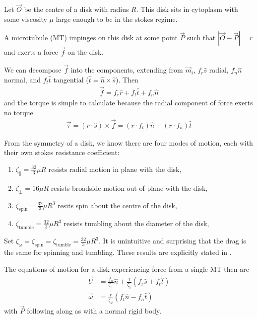 \documentclass[footheight=20pt, footsepline, headheight=20pt, headsepline]{scrartcl}
\begin{document}
	Let $\vec{O}$ be the centre of a disk with radius $R$. This disk sits in cytoplasm with some viscosity $\mu$ large enough to be in the stokes regime.

	A microtubule (MT) impinges on this disk at some point $\vec{P}$ such that $|\vec{O} - \vec{P}| = r$ and exerts a force $\vec{f}$ on the disk.

	We can decompose $\vec{f}$ into the components, extending from $\vec{m}_i$, $f_r \hat{s}$ radial, $f_n \hat{n}$ normal, and $f_t \hat{t}$ tangential ($\hat{t} = \hat{n} \times \hat{s}$).
	Then 
	\begin{align}
		\vec{f} = f_r \hat{r} + f_t \hat{t} + f_n \hat{n}
	\end{align}
	and the torque is simple to calculate because the radial component of force exerts no torque
	\begin{align}
		\vec{\tau} = (r \cdot \hat{s}) \times \vec{f} =  (r \cdot f_t) \hat{n} - (r \cdot f_n) \hat{t}
	\end{align}

	From the symmetry of a disk, we know there are four modes of motion, each with their own stokes resistance coefficient:
	\begin{enumerate}
		\item $\zeta_\parallel = \frac{32}{3} \mu R$ resists radial motion in plane with the disk,
		\item $\zeta_\perp = 16 \mu R$ resists broadside motion out of plane with the disk,
		\item $\zeta_\text{spin} = \frac{32}{3} \mu R^3$ resits spin about the centre of the disk,
		\item $\zeta_\text{tumble} = \frac{32}{3} \mu R^3$ resists tumbling about the diameter of the disk,
	\end{enumerate}
	Set $\zeta_\omega = \zeta_\text{spin} = \zeta_\text{tumble} = \frac{32}{3} \mu R^3$.
	It is unintuitive and surprising that the drag is the same for spinning and tumbling. 
	These results are explicitly stated in \cite{kim2013microhydrodynamics}.

	The equations of motion for a disk experiencing force from a single MT then are
	\begin{align}
		\vec{U} &= \frac{f_n}{\zeta_\perp} \hat{n} + \frac{1}{\zeta_\parallel} (f_r \hat{s} + f_t \hat{t}) \\
		\vec{\omega} &= \frac{r}{\zeta_\omega} (f_t \hat{n} - f_n \hat{t})
	\end{align}
	with $\vec{P}$ following along as with a normal rigid body.
\end{document}
